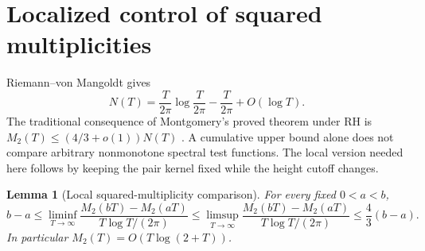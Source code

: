 \documentclass[11pt]{article}
\newtheorem{lemma}[theorem]{Lemma}
\theoremstyle{definition}\newtheorem{definition}[theorem]{Definition}
\theoremstyle{remark}\newtheorem{remark}[theorem]{Remark}
\begin{document}
\section{Localized control of squared multiplicities}\label{sec:local}
Riemann--von Mangoldt gives
\begin{equation}\label{eq:RVM}
 N(T)=\frac{T}{2\pi}\log\frac{T}{2\pi}-\frac{T}{2\pi}+O(\log T).
\end{equation}
The traditional consequence of Montgomery's proved theorem under RH is
$M_2(T)\le(4/3+o(1))N(T)$ \cite{montgomery,CGG}. A cumulative upper bound
alone does not compare arbitrary nonmonotone spectral test functions.
The local version needed here follows by keeping the pair kernel fixed
while the height cutoff changes.

\begin{lemma}[Local squared-multiplicity comparison]\label{lem:local}
For every fixed $0<a<b$,
\begin{equation}\label{eq:localM}
 b-a\le\liminf_{T\to\infty}
 \frac{M_2(bT)-M_2(aT)}{T\log T/(2\pi)}
 \le\limsup_{T\to\infty}
 \frac{M_2(bT)-M_2(aT)}{T\log T/(2\pi)}
 \le\frac43(b-a).
\end{equation}
In particular $M_2(T)=O(T\log(2+T))$.
\end{lemma}
\end{document}

